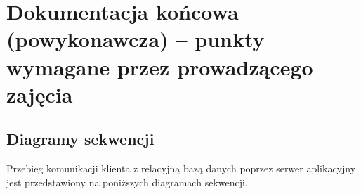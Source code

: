 \documentclass[10pt,a4paper]{article}
\begin{document}

\newpage
\section{Dokumentacja końcowa (powykonawcza) -- punkty wymagane przez prowadzącego zajęcia}

\subsection{Diagramy sekwencji}
Przebieg komunikacji klienta z relacyjną bazą danych poprzez serwer aplikacyjny jest przedstawiony na poniższych diagramach sekwencji.
\end{document}
